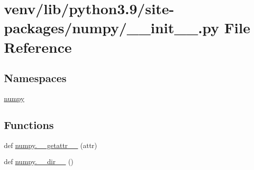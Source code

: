 \hypertarget{venv_2lib_2python3_89_2site-packages_2numpy_2____init_____8py}{}\section{venv/lib/python3.9/site-\/packages/numpy/\+\_\+\+\_\+init\+\_\+\+\_\+.py File Reference}
\label{venv_2lib_2python3_89_2site-packages_2numpy_2____init_____8py}
\subsection*{Namespaces}
\begin{DoxyCompactItemize}
\item 
 \hyperlink{namespacenumpy}{numpy}
\end{DoxyCompactItemize}
\subsection*{Functions}
\begin{DoxyCompactItemize}
\item 
def \hyperlink{namespacenumpy_a769fc49989b89b83a8a22d1fc5957707}{numpy.\+\_\+\+\_\+getattr\+\_\+\+\_\+} (attr)
\item 
def \hyperlink{namespacenumpy_a05ae198afa113ce10c617885c28b79fa}{numpy.\+\_\+\+\_\+dir\+\_\+\+\_\+} ()
\end{DoxyCompactItemize}
